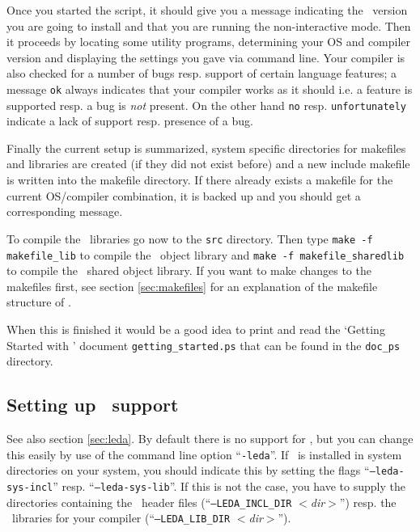 Once you started the script, it should give you a message indicating
the \cgal\ version you are going to install and that you are running
the non-interactive mode. Then it proceeds by locating some utility
programs, determining your OS and compiler version and displaying the
settings you gave via command line. Your compiler is also checked for
a number of bugs resp. support of certain language features; a message
\texttt{ok} always indicates that your compiler works as it should
i.e. a feature is supported resp. a bug is \textit{not} present. On
the other hand \texttt{no} resp.  \texttt{unfortunately} indicate a
lack of support resp. presence of a bug.

Finally the current setup is summarized, system specific directories
for makefiles and libraries are created (if they did not exist before)
and a new include makefile is written into the makefile directory. If
there already exists a makefile for the current OS/compiler
combination, it is backed up and you should get a corresponding
message.

To compile the \cgal\ libraries go now to the \texttt{src} directory.
Then type \texttt{make -f makefile\_lib} to compile the \cgal\ object
library and \texttt{make -f makefile\_sharedlib} to compile the \cgal\ 
shared object library. If you want to make changes to the makefiles
first, see section \ref{sec:makefiles} for an explanation of the
makefile structure of \cgal.

When this is finished it would be a good idea to print and read the
`Getting Started with \cgal'\index{CGAL@\cgal!getting started} document
\texttt{getting\_started.ps} that can be found in the \texttt{doc\_ps}
directory.

\subsection{Setting up \leda\ support}\label{sec:leda-setup}

See also section \ref{sec:leda}. By default there is no support for
\leda, but you can change this easily by use of the command line
option ``\texttt{-leda}''. If \leda\ is installed in system
directories on your system, you should indicate this by setting the
flags ``{\tt --leda-sys-incl}'' resp.  ``\texttt{--leda-sys-lib}''. If
this is not the case, you have to supply the directories containing
the \leda\ header files (``\texttt{--LEDA\_INCL\_DIR}
\textit{$<$dir$>$}'') resp. the \leda\ 
libraries for your compiler (``\texttt{--LEDA\_LIB\_DIR} {\it
  $<$dir$>$}''\TTindex{LEDA\_LIB\_DIR}).

